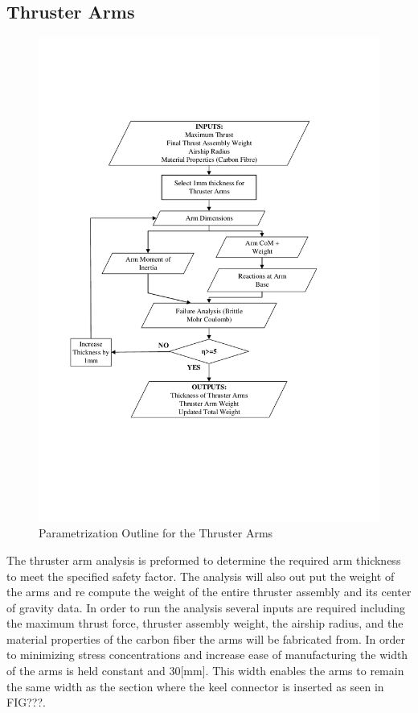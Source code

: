 \documentclass[../main.tex]{subfiles}
\begin{document}
\subsection{Thruster Arms} \label{thrustArms}

\begin{figure}[H]
	\centering
	\includegraphics[width=.9\linewidth]{img/paramaterization/thrusterArms.pdf}
	\caption{Parametrization Outline for the Thruster Arms}
	\label{fig:thrusterArmsParametrization}
\end{figure}

The thruster arm analysis is preformed to determine the required arm thickness to meet the specified safety factor. The analysis will also out put the weight of the arms and re compute the weight of the entire thruster assembly and its center of gravity data. In order to run the analysis several inputs are required including the maximum thrust force, thruster assembly weight, the airship radius, and the material properties of the carbon fiber the arms will be fabricated from. In order to minimizing stress concentrations and increase ease of manufacturing the width of the arms is held constant and 30[mm]. This width enables the arms to remain the same width as the section where the keel connector is inserted as seen in FIG???. 
\end{document}
